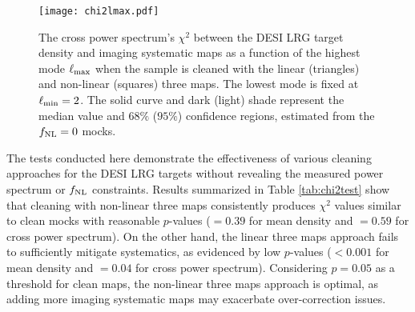 \begin{figure}
\centering
\texttt{[image: chi2lmax.pdf]}
\caption{The cross power spectrum's $\chi^{2}$ between the DESI LRG target density and imaging systematic maps as a function of the highest mode $\ell_{\rm max}$ when the sample is cleaned with the linear (triangles) and non-linear (squares) three maps. The lowest mode is fixed at $\ell_{\rm min}=2$. The solid curve and dark (light) shade represent the median value and $68\%$ ($95\%$) confidence regions, estimated from the $f_{\rm NL}=0$ mocks.}\label{fig:chi2cellextend}
\end{figure}

The tests conducted here demonstrate the effectiveness of various cleaning approaches for the DESI LRG targets without revealing the measured power spectrum or $f_{\rm NL}$ constraints. Results summarized in Table \ref{tab:chi2test} show that cleaning with non-linear three maps consistently produces $\chi^{2}$ values similar to clean mocks with reasonable $p$-values ($=0.39$ for mean density and $=0.59$ for cross power spectrum). On the other hand, the linear three maps approach fails to sufficiently mitigate systematics, as evidenced by low $p$-values ($< 0.001$ for mean density and $=0.04$ for cross power spectrum). Considering $p=0.05$ as a threshold for clean maps, the non-linear three maps approach is optimal, as adding more imaging systematic maps may exacerbate over-correction issues. 



